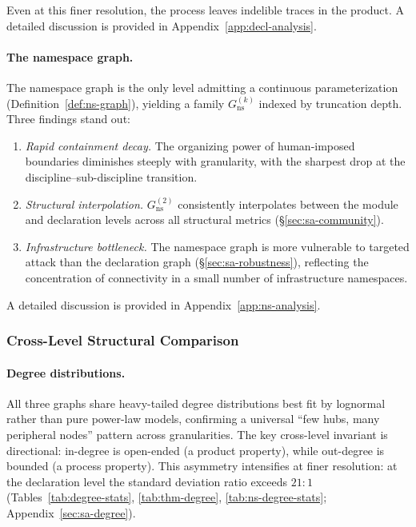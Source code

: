 \noindent
Even at this finer resolution, the process leaves indelible traces in the product. A detailed discussion is provided in Appendix~\ref{app:decl-analysis}.

\paragraph{The namespace graph.}
\label{sec:ns-analysis}
The namespace graph is the only level admitting a continuous parameterization (Definition~\ref{def:ns-graph}), yielding a family $G_{\mathrm{ns}}^{(k)}$ indexed by truncation depth. Three findings stand out:

\begin{enumerate}
    \item \textit{Rapid containment decay.} The organizing power of human-imposed boundaries diminishes steeply with granularity, with the sharpest drop at the discipline--sub-discipline transition.

    \item \textit{Structural interpolation.} $G_{\mathrm{ns}}^{(2)}$ consistently interpolates between the module and declaration levels across all structural metrics (\S\ref{sec:sa-community}).

    \item \textit{Infrastructure bottleneck.} The namespace graph is more vulnerable to targeted attack than the declaration graph (\S\ref{sec:sa-robustness}), reflecting the concentration of connectivity in a small number of infrastructure namespaces.
\end{enumerate}

\noindent
A detailed discussion is provided in Appendix~\ref{app:ns-analysis}.

\subsubsection{Cross-Level Structural Comparison}

\paragraph{Degree distributions.}
All three graphs share heavy-tailed degree distributions best fit by lognormal rather than pure power-law models, confirming a universal ``few hubs, many peripheral nodes'' pattern across granularities. The key cross-level invariant is directional: in-degree is open-ended (a product property), while out-degree is bounded (a process property). This asymmetry intensifies at finer resolution: at the declaration level the standard deviation ratio exceeds $21{:}1$ (Tables~\ref{tab:degree-stats}, \ref{tab:thm-degree}, \ref{tab:ns-degree-stats}; Appendix~\ref{sec:sa-degree}).

